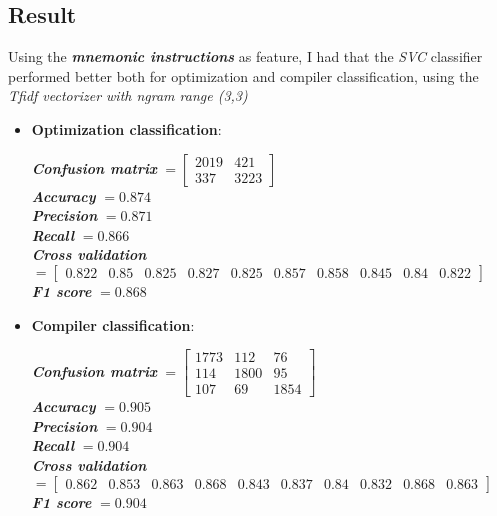 \documentclass[11pt]{article}
\begin{document}
\subsection{Result}
Using the \textbf{\textit{mnemonic instructions}} as feature, I had that the \textit{SVC} classifier performed better both for optimization and compiler classification, using the \textit{Tfidf vectorizer with ngram range (3,3)}
\begin{itemize}
	\item \textbf{Optimization classification}: \\
	\begin{center}
		\textbf{\textit{Confusion matrix}} $= \begin{bmatrix}
		2019 & 421 \\
		337 & 3223
		\end{bmatrix}$\\
		\textbf{\textit{Accuracy}} $= 0.874$\\
		\textbf{\textit{Precision}} $= 0.871$\\
		\textbf{\textit{Recall}} $= 0.866$\\
		\textbf{\textit{Cross validation}} $= \begin{bmatrix}
		0.822 & 0.85 & 0.825 & 0.827 & 0.825 & 0.857 & 0.858 & 0.845 & 0.84 & 0.822
		\end{bmatrix}$\\
		\textbf{\textit{F1 score}} $= 0.868$
	\end{center}
	
	\item \textbf{Compiler classification}: \\
	\begin{center}
		\textbf{\textit{Confusion matrix}} $= \begin{bmatrix}
		1773 & 112 & 76 \\
		114 & 1800 & 95 \\
		107 & 69 & 1854
		\end{bmatrix}$\\
		\textbf{\textit{Accuracy}} $= 0.905$\\
		\textbf{\textit{Precision}} $= 0.904$\\
		\textbf{\textit{Recall}} $= 0.904$\\
		\textbf{\textit{Cross validation}} $= \begin{bmatrix}
		0.862 & 0.853 & 0.863 & 0.868 & 0.843 & 0.837 & 0.84 & 0.832 & 0.868 & 0.863
		\end{bmatrix}$\\
		\textbf{\textit{F1 score}} $= 0.904$
	\end{center}
\end{itemize}
\end{document}
